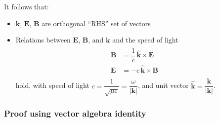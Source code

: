 \documentclass[letterpaper,10pt,english]{jupyterBook}
\begin{document}
\sphinxAtStartPar
It follows that:
\begin{itemize}
\item {} 
\sphinxAtStartPar
\(\mathbf{k}\), \(\mathbf{E}\), \(\mathbf{B}\) are orthogonal “RHS” set of vectors

\item {} 
\sphinxAtStartPar
Relations between \(\mathbf{E}\), \(\mathbf{B}\), and \(\mathbf{k}\) and the speed of light
\begin{equation*}
\begin{split}\begin{aligned}
      \mathbf{B} & = \dfrac{1}{c} \, \hat{\mathbf{k}} \times \mathbf{E} \\
      \mathbf{E} & = - c \, \hat{\mathbf{k}} \times \mathbf{B} \\
    \end{aligned}\end{split}
\end{equation*}
\sphinxAtStartPar
hold, with speed of light \(c = \dfrac{1}{\sqrt{\mu \varepsilon}} = \dfrac{\omega}{|\mathbf{k}|}\), and unit vector \(\hat{\mathbf{k}} = \dfrac{\mathbf{k}}{|\mathbf{k}|}\).

\end{itemize}
\subsubsection*{Proof using vector algebra identity}
\end{document}
